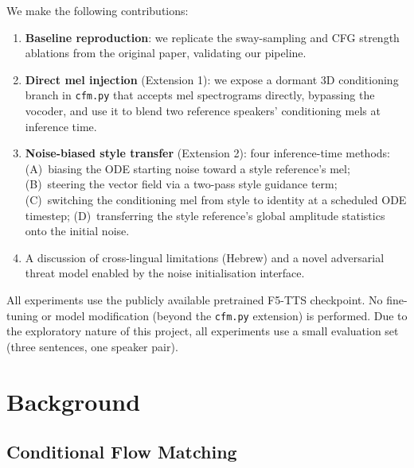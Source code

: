 \documentclass[11pt,a4paper,twocolumn]{article}
\begin{document}
We make the following contributions:
\begin{enumerate}[leftmargin=*,label=(\arabic*)]
  \item \textbf{Baseline reproduction}: we replicate the sway-sampling and
    CFG strength ablations from the original paper, validating our pipeline.
  \item \textbf{Direct mel injection} (Extension 1): we expose a dormant 3D
    conditioning branch in \texttt{cfm.py} that accepts mel spectrograms
    directly, bypassing the vocoder, and use it to blend two reference
    speakers' conditioning mels at inference time.
  \item \textbf{Noise-biased style transfer} (Extension 2): four
    inference-time methods: (A)~biasing the ODE starting noise toward a
    style reference's mel; (B)~steering the vector field via a two-pass
    style guidance term; (C)~switching the conditioning mel from style to
    identity at a scheduled ODE timestep; (D)~transferring the style
    reference's global amplitude statistics onto the initial noise.
  \item A discussion of cross-lingual limitations (Hebrew) and a novel adversarial threat model enabled by the noise initialisation interface.
\end{enumerate}

All experiments use the publicly available pretrained F5-TTS checkpoint.
No fine-tuning or model modification (beyond the \texttt{cfm.py} extension)
is performed.
Due to the exploratory nature of this project, all experiments use a small
evaluation set (three sentences, one speaker pair).

\section{Background}
\label{sec:background}

\subsection{Conditional Flow Matching}
\label{sec:cfm}
\end{document}
